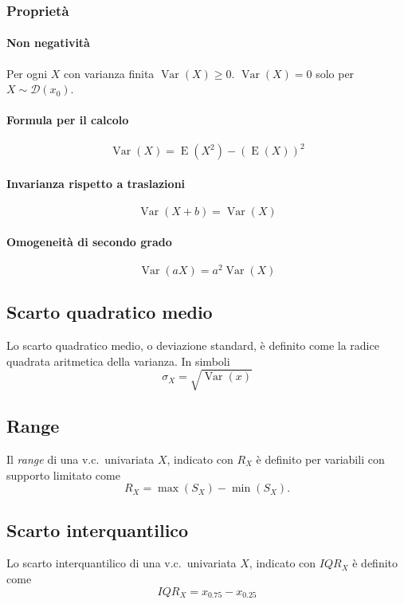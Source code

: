 \documentclass[11pt,a4paper,twoside]{article}
\let\geq\geqslant%
\newcommand\D{\mathcal{D}}
\DeclareMathOperator{\Var}{Var}
\DeclareMathOperator{\E}{E}
\begin{document}
\subsubsection{Proprietà}

\paragraph{Non negatività} Per ogni \(X\) con varianza finita
\(\Var(X)\geq 0\).  \(\Var(X) = 0\) solo per \(X\sim \D(x_0)\).

\paragraph{Formula per il calcolo}
\[
  \Var(X) = \E(X^2) - ( \E(X) )^2
\]

\paragraph{Invarianza rispetto a traslazioni}
\[
  \Var(X+b) = \Var(X)
\]

\paragraph{Omogeneità di secondo grado}
\[
  \Var(aX) = a^2 \Var(X)
\]

\subsection{Scarto quadratico medio}

Lo scarto quadratico medio, o deviazione standard, è definito come la
radice quadrata aritmetica della varianza.  In simboli
\[
  \sigma_X = \sqrt{\Var(x)}
\]

\subsection{Range}

Il \textit{range} di una v.c.\ univariata \(X\), indicato con \(R_X\)
è definito per variabili con supporto limitato come
\[
  R_X = \max(S_X) - \min(S_X).
\]

\subsection{Scarto interquantilico}
Lo scarto interquantilico di una v.c.\ univariata \(X\), indicato con
\(IQR_X\) è definito come
\[
  IQR_X = x_{0.75} - x_{0.25}
\]
\end{document}

